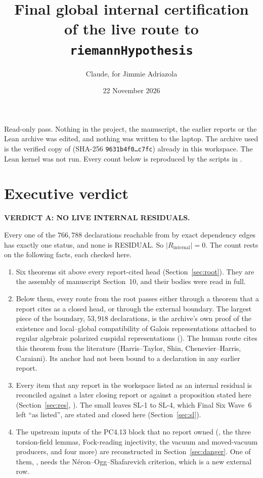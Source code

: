 \documentclass[10pt]{article}
\title{Final global internal certification\\ of the live route to \texttt{riemannHypothesis}}
\author{Claude, for Jimmie Adriazola}
\date{22 November 2026}
\newcommand{\SL}[1]{\textsf{SL-#1}}
\begin{document}
\maketitle

\noindent Read-only pass. Nothing in the project, the manuscript, the earlier reports or the Lean archive was edited, and nothing was written to the laptop. The archive used is the verified copy of  (SHA-256 \texttt{9631b4f0\ldots c7fc}) already in this workspace. The Lean kernel was not run. Every count below is reproduced by the scripts in .

\section{Executive verdict}

\textbf{VERDICT A: NO LIVE INTERNAL RESIDUALS.}

Every one of the $766{,}788$ declarations reachable from  by exact dependency edges has exactly one status, and none is RESIDUAL. So $\lvert R_{\mathrm{internal}}\rvert=0$. The count rests on the following facts, each checked here.
\begin{enumerate}[nosep]
\item Six theorems sit above every report-cited head (Section~\ref{sec:root}). They are the assembly of manuscript Section~10, and their bodies were read in full.
\item Below them, every route from the root passes either through a theorem that a report cites as a closed head, or through the external boundary. The largest piece of the boundary, $53{,}918$ declarations, is the archive's own proof of the existence and local--global compatibility of Galois representations attached to regular algebraic polarized cuspidal representations (). The human route cites this theorem from the literature (Harris--Taylor, Shin, Chenevier--Harris, Caraiani). Its anchor had not been bound to a declaration in any earlier report.
\item Every item that any report in the workspace listed as an internal residual is reconciled against a later closing report or against a proposition stated here (Section~\ref{sec:res}, ). The small leaves \SL{1} to \SL{4}, which Final Six Wave~6 left ``as listed'', are stated and closed here (Section~\ref{sec:sl}).
\item The upstream inputs of the PC4.13 block that no report owned (, the three torsion-field lemmas, Fock-reading injectivity, the vacuum and moved-vacuum producers,  and four more) are reconstructed in Section~\ref{sec:danger}. One of them, , needs the N\'eron--Ogg--Shafarevich criterion, which is a new external row.
\end{enumerate}
\end{document}
